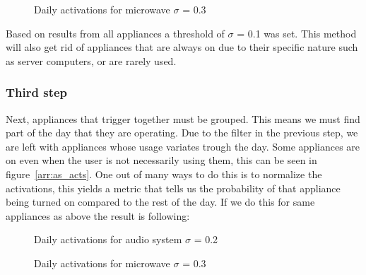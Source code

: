 \begin{figure}[H]
    \centering
    \caption{Daily activations for microwave $\sigma$ = 0.3}
    \label{arr:microwave_acts}
\end{figure}

Based on results from all appliances a threshold of $\sigma$ = 0.1 was set.
This method will also get rid of appliances that are always on due to their specific nature such as server computers, 
or are rarely used. 

\subsubsection{Third step}

Next, appliances that trigger together must be grouped. 
This means we must find part of the day that they are operating.
Due to the filter in the previous step, we are left with appliances whose usage variates trough the day. 
Some appliances are on even when the user is not necessarily using them, this can be seen in figure \ref{arr:as_acts}.
One out of many ways to do this is to normalize the activations, this yields a metric that tells us the probability of that appliance being turned on compared to the rest of the day. 
If we do this for same appliances as above the result is following: 

\begin{figure}[H]
    \centering
    \caption{Daily activations for audio system $\sigma$ = 0.2}
    \label{arr:as_acts_norm}
\end{figure}

\begin{figure}[H]
    \centering
    \caption{Daily activations for microwave $\sigma$ = 0.3}
    \label{arr:microwave_acts_norm}
\end{figure}

